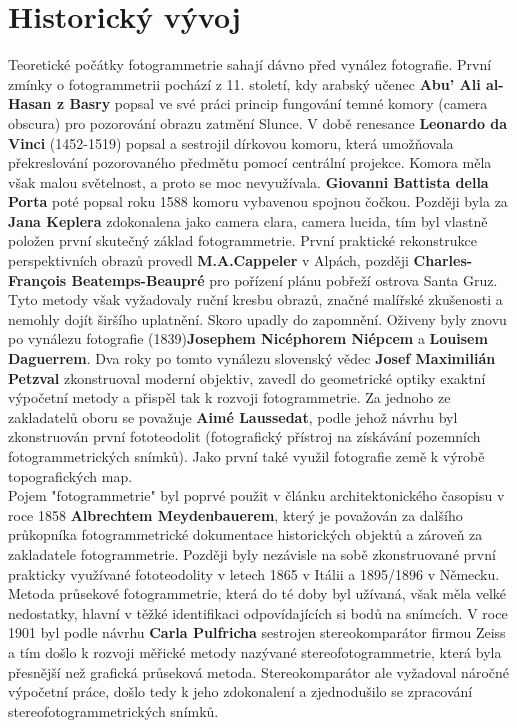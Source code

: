 \documentclass[12pt]{report}			%
\begin{document}
			\section{Historický vývoj}
                Teoretické počátky fotogrammetrie sahají dávno před vynález fotografie. 
                První zmínky o fotogrammetrii pochází z 11. století, kdy arabský učenec \textbf{Abu' Ali al-Hasan z Basry} popsal ve své práci princip fungování temné komory (camera obscura) pro pozorování obrazu zatmění Slunce. V době renesance \textbf{Leonardo da Vinci} (1452-1519) popsal a sestrojil dírkovou komoru, která umožňovala překreslování pozorovaného předmětu pomocí centrální projekce. Komora měla však malou světelnost, a proto se moc nevyužívala. \textbf{Giovanni Battista della Porta} poté popsal roku 1588 komoru vybavenou spojnou čočkou. Později byla za \textbf{Jana Keplera} zdokonalena jako \UIV{}camera clara, camera lucida, tím byl vlastně položen první skutečný základ fotogrammetrie. První praktické rekonstrukce perspektivních obrazů provedl \textbf{M.A.Cappeler} v Alpách, později \textbf{Charles-François Beatemps-Beaupré} pro pořízení plánu pobřeží ostrova Santa Gruz. Tyto metody však vyžadovaly ruční kresbu obrazů, značné malířské zkušenosti a nemohly dojít širšího uplatnění. Skoro upadly do zapomnění. Oživeny byly znovu po vynálezu fotografie (1839)\textbf{Josephem Nicéphorem Niépcem} a \textbf{Louisem Daguerrem}. Dva roky po tomto vynálezu slovenský vědec \textbf{Josef Maximilián Petzval} zkonstruoval moderní objektiv, zavedl do geometrické optiky exaktní výpočetní metody a přispěl tak k rozvoji fotogrammetrie. Za jednoho ze zakladatelů oboru se považuje \textbf{Aimé Laussedat}, podle jehož návrhu byl zkonstruován první fototeodolit (fotografický přístroj na získávání pozemních fotogrammetrických snímků). Jako první také využil fotografie země k výrobě topografických map.
                \\Pojem "fotogrammetrie" byl poprvé použit v článku architektonického časopisu v roce 1858 \textbf{Albrechtem Meydenbauerem}, který je považován za dalšího průkopníka fotogrammetrické dokumentace historických objektů a zároveň za zakladatele fotogrammetrie. Později byly nezávisle na sobě zkonstruované první prakticky využívané fototeodolity v letech 1865 v Itálii a 1895/1896 v Německu. Metoda průsekové fotogrammetrie, která do té doby byl užívaná, však měla velké nedostatky, hlavní v těžké identifikaci odpovídajících si bodů na snímcích. V roce 1901 byl podle návrhu \textbf{Carla Pulfricha} sestrojen stereokomparátor firmou Zeiss a tím došlo k rozvoji měřické metody nazývané stereofotogrammetrie, která byla přesnější než grafická průseková metoda. Stereokomparátor ale vyžadoval náročné výpočetní práce, došlo tedy k jeho zdokonalení a zjednodušilo se zpracování stereofotogrammetrických snímků. 
\end{document}
